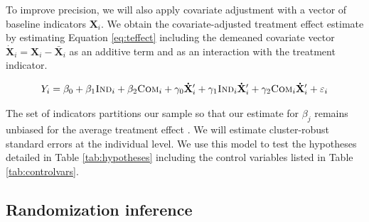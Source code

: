 \documentclass[11pt, a4paper]{article}\usepackage[]{graphicx}\usepackage[]{color}
\begin{document}
        To improve precision, we will also apply covariate adjustment with a vector of baseline indicators $\mathbf{X}_i$. We obtain the covariate-adjusted treatment effect estimate by estimating Equation \ref{eq:teffect} including the demeaned covariate vector $\mathbf{\dot X}_{i} = \mathbf{X}_{i} - \mathbf{\bar X}_{i}$ as an additive term and as an interaction with the treatment indicator. %

        \begin{equation} \label{eq:controls}
            Y_{i} = \beta_{0} + \beta_{1}\text{\textsc{Ind}}_{i} + \beta_{2}\text{\textsc{Com}}_{i} + \gamma_{0} \mathbf{\dot X}'_i + \gamma_{1}\text{\textsc{Ind}}_{i} \mathbf{\dot X}'_i + \gamma_{2}\text{\textsc{Com}}_{i} \mathbf{\dot X}'_i + \varepsilon_{i}
        \end{equation}

        The set of indicators partitions our sample so that our estimate for $\beta_j$ remains unbiased for the average treatment effect \parencite{lin_agnostic_2013}. We will estimate cluster-robust standard errors at the individual level. We use this model to test the hypotheses detailed in Table \ref{tab:hypotheses} including the control variables listed in Table \ref{tab:controlvars}.

        \begin{table}[t]
        \centering
        \caption{Control variables for covariate adjustment}
        \label{tab:controlvars}
        \end{table}

    \subsection{Randomization inference} %
\end{document}
